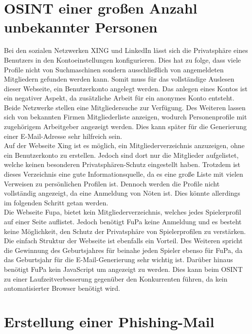 \section{OSINT einer großen Anzahl unbekannter Personen}
Bei den sozialen Netzwerken XING und LinkedIn lässt sich die Privatsphäre eines Benutzers in den Kontoeinstellungen konfigurieren. Dies hat zu folge, dass viele Profile nicht von Suchmaschinen sondern ausschließlich von angemeldeten Mitgliedern gefunden werden kann. Somit muss für das vollständige Auslesen dieser Webseite, ein Benutzerkonto angelegt werden. Das anlegen eines Kontos ist ein negativer Aspekt, da zusätzliche Arbeit für ein anonymes Konto entsteht.\\ Beide Netzwerke stellen eine Mitgliedersuche zur Verfügung. Des Weiteren lassen sich von bekannten Firmen Mitgliederliste anzeigen, wodurch Personenprofile mit zugehörigem Arbeitgeber angezeigt werden. Dies kann später für die Generierung einer E-Mail-Adresse sehr hilfreich sein.\\
Auf der Webseite Xing ist es möglich, ein Mitgliederverzeichnis anzuzeigen, ohne ein Benutzerkonto zu erstellen. Jedoch sind dort nur die Mitglieder aufgelistet, welche keinen besonderen Privatsphären-Schutz eingestellt haben. Trotzdem ist dieses Verzeichnis eine gute Informationsquelle, da es eine große Liste mit vielen Verweisen zu persönlichen Profilen ist. Dennoch werden die Profile nicht vollständig angezeigt, da eine Anmeldung von Nöten ist. Dies könnte allerdings im folgenden Schritt getan werden.\\
Die Webseite Fupa, bietet kein Mitgliederverzeichnis, welches jedes Spielerprofil auf einer Seite auflistet. Jedoch benötigt FuPa keine Anmeldung und es besteht keine Möglichkeit, den Schutz der Privatsphäre von Spielerprofilen zu verstärken. Die einfach Struktur der Webseite ist ebenfalls ein Vorteil. Des Weiteren spricht die Gewinnung des Geburtsjahres für beinahe jeden Spieler ebenso für FuPa, da das Geburtsjahr für die E-Mail-Generierung sehr wichtig ist. Darüber hinaus benötigt FuPa kein JavaScript um angezeigt zu werden. Dies kann beim OSINT zu einer Laufzeitverbesserung gegenüber den Konkurrenten führen, da kein automatisierter Browser benötigt wird.

\section{Erstellung einer Phishing-Mail}
